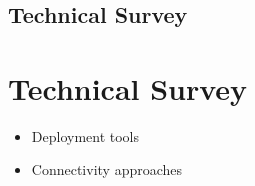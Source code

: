 \hypertarget{section}{%
\chapter{}\label{section}}

\section{Technical Survey}

\hypertarget{technical-survey}{%
\chapter{Technical Survey}\label{technical-survey}}

\begin{itemize}
\tightlist
\item
  Deployment tools
\item
  Connectivity approaches
\end{itemize}
